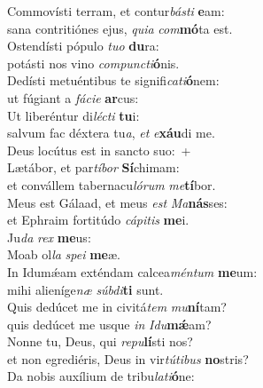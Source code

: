 \evenverse Commovísti terram, et contur\textit{bá}\textit{sti} \textbf{e}am:~\*\\
\evenverse sana contritiónes ejus, \textit{qui}\textit{a} \textit{com}\textbf{mó}ta est.\\
\oddverse Ostendísti pópulo \textit{tu}\textit{o} \textbf{du}ra:~\*\\
\oddverse potásti nos vino \textit{com}\textit{pun}\textit{cti}\textbf{ó}nis.\\
\evenverse Dedísti metuéntibus te signifi\textit{ca}\textit{ti}\textbf{ó}nem:~\*\\
\evenverse ut fúgiant a \textit{fá}\textit{ci}\textit{e} \textbf{ar}cus:\\
\oddverse Ut liberéntur di\textit{lé}\textit{cti} \textbf{tu}i:~\*\\
\oddverse salvum fac déxtera tu\textit{a}, \textit{et} \textit{e}\textbf{xáu}di me.\\
\evenverse Deus locútus est in sancto suo:~+\\
\evenverse  Lætábor, et par\textit{tí}\textit{bor} \textbf{Sí}chimam:~\*\\
\evenverse et convállem tabernacu\textit{ló}\textit{rum} \textit{me}\textbf{tí}bor.\\
\oddverse Meus est Gálaad, et meus \textit{est} \textit{Ma}\textbf{nás}ses:~\*\\
\oddverse et Ephraim fortitúdo \textit{cá}\textit{pi}\textit{tis} \textbf{me}i.\\
\evenverse Ju\textit{da} \textit{rex} \textbf{me}us:~\*\\
\evenverse Moab ol\textit{la} \textit{spe}\textit{i} \textbf{me}æ.\\
\oddverse In Idumǽam exténdam calcea\textit{mén}\textit{tum} \textbf{me}um:~\*\\
\oddverse mihi alieníge\textit{næ} \textit{súb}\textit{di}\textbf{ti} sunt.\\
\evenverse Quis dedúcet me in civitá\textit{tem} \textit{mu}\textbf{ní}tam?~\*\\
\evenverse quis dedúcet me usque \textit{in} \textit{I}\textit{du}\textbf{mǽ}am?\\
\oddverse Nonne tu, Deus, qui \textit{re}\textit{pu}\textbf{lí}sti nos?~\*\\
\oddverse et non egrediéris, Deus in vir\textit{tú}\textit{ti}\textit{bus} \textbf{no}stris?\\
\evenverse Da nobis auxílium de tribu\textit{la}\textit{ti}\textbf{ó}ne:~\*\\
